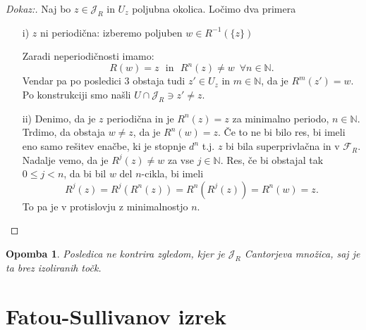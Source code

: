\documentclass{article}
\newtheorem{opomba}{Opomba}
\newcommand{\N}{\mathbb{N}}
\newcommand{\F}{\mathcal{F}}
\begin{document}
\begin{proof}[Dokaz:]
Naj bo $z\in \mathcal{J}_R$ in $U_z$ poljubna okolica. Ločimo dva primera 
\begin{enumerate}
    \item[i)] $z$ ni periodična: izberemo poljuben $w \in R^{-1}(\{z\})$\\
    \begin{center}
        \end{center}
    Zaradi neperiodičnosti imamo: 
    $$
    R(w) = z \,\, \text{ in } \,\, R^n(z) \neq w \,\,\, \forall n\in \N.
    $$
    Vendar pa po posledici $3$ obstaja tudi $z' \in U_z$ in $m\in \N$, 
    da je $R^m(z') = w$. Po konstrukciji smo našli $U\cap \mathcal{J}_R \ni z' \neq z$.
    \item[ii)] Denimo, da je $z$ periodična in je $R^n(z) = z$ za minimalno periodo, 
    $n\in \N$. Trdimo, da obstaja $w \neq z$, da je $R^n(w) = z$. Če to ne bi bilo 
    res, bi imeli eno samo rešitev enačbe, ki je stopnje $d^n$ t.j. $z$ bi 
    bila superprivlačna in v $\F_R$. Nadalje vemo, da je $R^j(z) \neq w$
     za vse $j\in \N$. Res, če bi obstajal tak $0 \leq j < n$, da bi bil $w$
     del $n$-cikla, bi imeli 
     $$
     R^j(z) = R^j(R^n(z)) = R^n(R^j(z)) = R^n(w) = z.
     $$
     To pa je v protislovju z minimalnostjo $n$.
\end{enumerate}
\end{proof}

\begin{opomba}
Posledica ne kontrira zgledom, kjer je $\mathcal{J}_R$ Cantorjeva množica, 
saj je ta brez izoliranih točk.
\end{opomba}

\section{Fatou-Sullivanov izrek}
\end{document}
